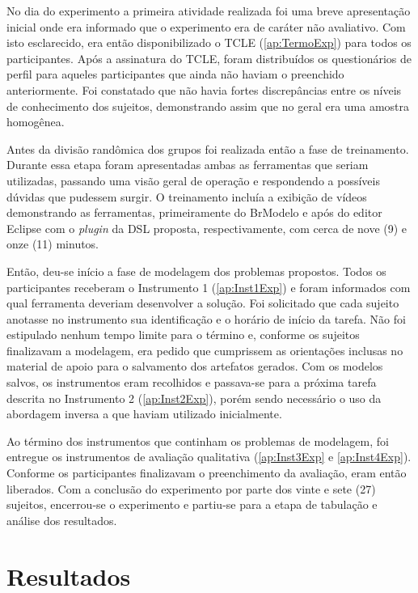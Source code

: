 No dia do experimento a primeira atividade realizada foi uma breve apresentação inicial onde era informado que o experimento era de caráter não avaliativo.
Com isto esclarecido, era então disponibilizado o \ac{TCLE} (\ref{ap:TermoExp}) para todos os participantes.
Após a assinatura do \ac{TCLE}, foram distribuídos os questionários de perfil para aqueles participantes que ainda não haviam o preenchido anteriormente.
Foi constatado que não havia fortes discrepâncias entre os níveis de conhecimento dos sujeitos, demonstrando assim que no geral era uma amostra homogênea.

Antes da divisão randômica dos grupos foi realizada então a fase de treinamento. 
Durante essa etapa foram apresentadas ambas as ferramentas que seriam utilizadas, passando uma visão geral de operação e respondendo a possíveis dúvidas que pudessem surgir.
O treinamento incluía a exibição de vídeos demonstrando as ferramentas, primeiramente do BrModelo e após do editor Eclipse com o \textit{plugin} da \ac{DSL} proposta, respectivamente, com cerca de nove (9) e onze (11) minutos. 

Então, deu-se início a fase de modelagem dos problemas propostos.
Todos os participantes receberam o Instrumento 1 (\ref{ap:Inst1Exp}) e foram informados com qual ferramenta deveriam desenvolver a solução.
Foi solicitado que cada sujeito anotasse no instrumento sua identificação e o horário de início da tarefa.
Não foi estipulado nenhum tempo limite para o término e, conforme os sujeitos finalizavam a modelagem, era pedido que cumprissem as orientações inclusas no material de apoio para o salvamento dos artefatos gerados.
Com os modelos salvos, os instrumentos eram recolhidos e passava-se para a próxima tarefa descrita no Instrumento 2 (\ref{ap:Inst2Exp}), porém sendo necessário o uso da abordagem inversa a que haviam utilizado inicialmente.

Ao término dos instrumentos que continham os problemas de modelagem, foi entregue os instrumentos de avaliação qualitativa (\ref{ap:Inst3Exp} e \ref{ap:Inst4Exp}). 
Conforme os participantes finalizavam o preenchimento da avaliação, eram então liberados.
Com a conclusão do experimento por parte dos vinte e sete (27) sujeitos, encerrou-se o experimento e partiu-se para a etapa de tabulação e análise dos resultados.

\section{Resultados} \label{sec:resultExp}

